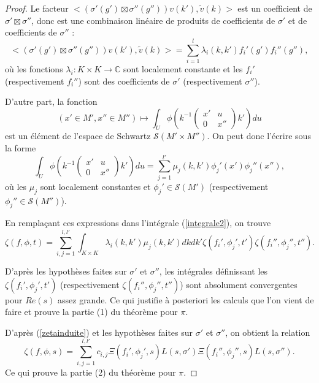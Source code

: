 \begin{proof}
Le facteur $<(\sigma'(g') \boxtimes \sigma''(g''))v(k'), \tilde{v}(k)>$ est un coefficient de $\sigma' \boxtimes \sigma''$, donc est une combinaison linéaire de produits de coefficients de $\sigma'$ et de coefficients de $\sigma''$ :
\begin{equation}
<(\sigma'(g') \boxtimes \sigma''(g''))v(k'), \tilde{v}(k)> = \sum_{i=1}^l \lambda_i(k,k')f_i'(g')f_i''(g''),
\end{equation}
où les fonctions $\lambda_i : K \times K \rightarrow \mathbb{C}$ sont localement constante et les $f_i'$ (respectivement $f_i''$) sont des coefficients de $\sigma'$ (respectivement $\sigma''$).

D'autre part, la fonction
\begin{equation}
(x' \in M', x'' \in M'') \mapsto \int_U \phi(k^{-1}\begin{pmatrix} 
x' & u \\
0 & x'' 
\end{pmatrix} k') du
\end{equation}
est un élément de l'espace de Schwartz $\mathcal{S}(M' \times M'')$. On peut donc l'écrire sous la forme
\begin{equation}
\label{u_integrale}
\int_U \phi(k^{-1}\begin{pmatrix} 
x' & u \\
0 & x'' 
\end{pmatrix} k') du = \sum_{j=1}^{l'} \mu_j(k, k')\phi_j'(x')\phi_j''(x''),
\end{equation}
où les $\mu_j$ sont localement constantes et $\phi_j' \in \mathcal{S}(M')$ (respectivement $\phi_j'' \in \mathcal{S}(M'')$).

En remplaçant ces expressions dans l'intégrale (\ref{integrale2}), on trouve
\begin{equation}
\label{zetainduite}
\zeta(f, \phi, t) = \sum_{i,j=1}^{l,l'} \int_{K \times K} \lambda_i(k,k')\mu_j(k,k') dk dk' \zeta(f_i',\phi_j',t') \zeta(f_i'',\phi_j'',t'').
\end{equation}

D'après les hypothèses faites sur $\sigma'$ et $\sigma''$, les intégrales définissant les $\zeta(f_i',\phi_j',t')$ (respectivement $\zeta(f_i'',\phi_j'',t'')$) sont absolument convergentes pour $Re(s)$ assez grande. Ce qui justifie à posteriori les calculs que l'on vient de faire et prouve la partie (1) du théorème pour $\pi$.

D'après (\ref{zetainduite}) et les hypothèses faites sur $\sigma'$ et $\sigma''$, on obtient la relation
\begin{equation}
\zeta(f,\phi,s)=\sum_{i,j=1}^{l,l'}c_{i,j}\Xi(f_i',\phi_j',s)L(s,\sigma')\Xi(f_i'',\phi_j'',s)L(s,\sigma'').
\end{equation}
Ce qui prouve la partie (2) du théorème pour $\pi$.


\end{proof}
